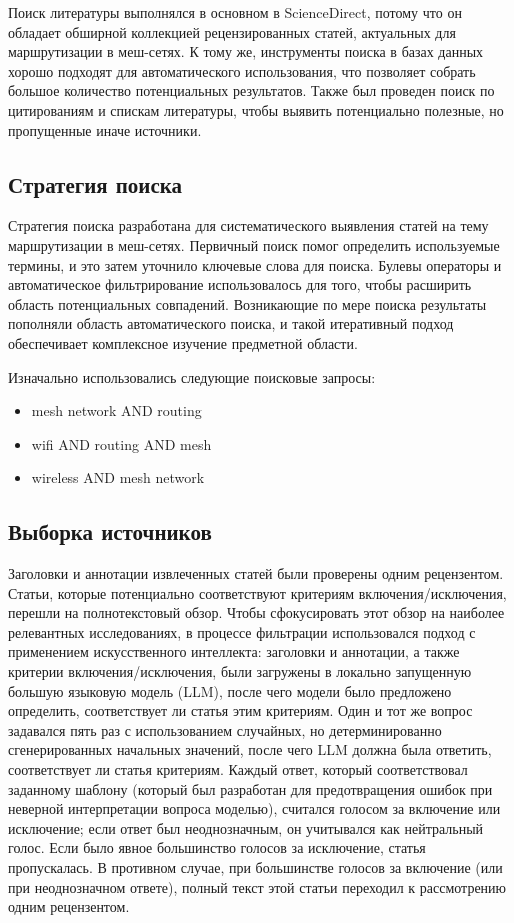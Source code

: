 \documentclass[%
]{report}
\begin{document}
Поиск литературы выполнялся в основном в ScienceDirect,
потому что он обладает обширной коллекцией рецензированных статей,
актуальных для маршрутизации в меш-сетях.
К тому же, инструменты поиска в базах данных хорошо подходят для
автоматического использования,
что позволяет собрать большое количество потенциальных результатов.
Также был проведен поиск по цитированиям и спискам литературы,
чтобы выявить потенциально полезные,
но пропущенные иначе источники.

\subsection{Стратегия поиска}\label{search-strategy}

Стратегия поиска разработана для систематического
выявления статей на тему маршрутизации в меш-сетях.
Первичный поиск помог определить используемые термины,
и это затем уточнило ключевые слова для поиска.
Булевы операторы и автоматическое фильтрирование
использовалось для того, чтобы расширить область потенциальных совпадений.
Возникающие по мере поиска результаты пополняли область автоматического поиска,
и такой итеративный подход обеспечивает комплексное изучение предметной области.

Изначально использовались следующие поисковые запросы:

\begin{itemize}
\item
  mesh network AND routing
\item
  wifi AND routing AND mesh
\item
  wireless AND mesh network
\end{itemize}

\subsection{Выборка источников}\label{selection-of-sources-of-evidence}

Заголовки и аннотации извлеченных статей
были проверены одним рецензентом. Статьи,
которые потенциально соответствуют критериям включения/исключения,
перешли на полнотекстовый обзор.
Чтобы сфокусировать этот обзор на наиболее
релевантных исследованиях,
в процессе фильтрации использовался подход
с применением искусственного интеллекта:
заголовки и аннотации, а также
критерии включения/исключения, были загружены
в локально запущенную большую языковую модель (LLM),
после чего модели было предложено определить,
соответствует ли статья этим критериям.
Один и тот же вопрос задавался пять раз
с использованием случайных,
но детерминированно сгенерированных начальных значений,
после чего LLM должна была ответить,
соответствует ли статья критериям.
Каждый ответ, который соответствовал заданному шаблону
(который был разработан для предотвращения ошибок
при неверной интерпретации вопроса моделью),
считался голосом за включение или исключение;
если ответ был неоднозначным,
он учитывался как нейтральный голос.
Если было явное большинство голосов за исключение,
статья пропускалась.
В противном случае, при большинстве голосов за включение
(или при неоднозначном ответе),
полный текст этой статьи переходил к рассмотрению одним рецензентом.
\end{document}
